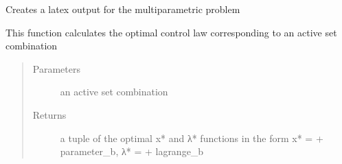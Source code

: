 \documentclass[letterpaper,10pt,english]{sphinxmanual}
\begin{document}
\begin{fulllineitems}

\begin{fulllineitems}
\label{\detokenize{ppopt:ppopt.mpqp_program.MPQP_Program.evaluate_objective}}
\end{fulllineitems}


\begin{fulllineitems}
\label{\detokenize{ppopt:ppopt.mpqp_program.MPQP_Program.latex}}
\sphinxAtStartPar
Creates a latex output for the multiparametric problem

\end{fulllineitems}


\begin{fulllineitems}
\label{\detokenize{ppopt:ppopt.mpqp_program.MPQP_Program.optimal_control_law}}
\sphinxAtStartPar
This function calculates the optimal control law corresponding to an active set combination
\begin{quote}\begin{description}
\item[{Parameters}] \leavevmode
\sphinxAtStartPar
{} \textendash{} an active set combination

\item[{Returns}] \leavevmode
\sphinxAtStartPar
a tuple of the optimal x* and λ* functions in the form x* =  + parameter\_b, λ* =  + lagrange\_b

\end{description}\end{quote}


\end{fulllineitems}
\end{fulllineitems}
\end{document}
